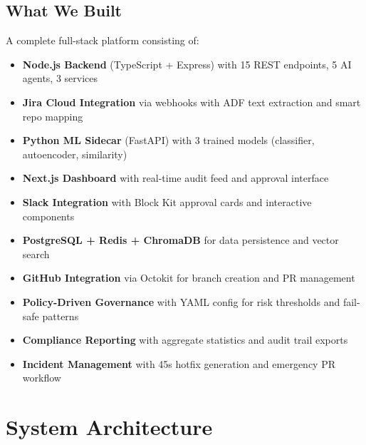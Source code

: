 \documentclass[11pt,a4paper]{article}
\begin{document}
\subsection{What We Built}
A complete full-stack platform consisting of:
\begin{itemize}
    \item \textbf{Node.js Backend} (TypeScript + Express) with 15 REST endpoints, 5 AI agents, 3 services
    \item \textbf{Jira Cloud Integration} via webhooks with ADF text extraction and smart repo mapping
    \item \textbf{Python ML Sidecar} (FastAPI) with 3 trained models (classifier, autoencoder, similarity)
    \item \textbf{Next.js Dashboard} with real-time audit feed and approval interface
    \item \textbf{Slack Integration} with Block Kit approval cards and interactive components
    \item \textbf{PostgreSQL + Redis + ChromaDB} for data persistence and vector search
    \item \textbf{GitHub Integration} via Octokit for branch creation and PR management
    \item \textbf{Policy-Driven Governance} with YAML config for risk thresholds and fail-safe patterns
    \item \textbf{Compliance Reporting} with aggregate statistics and audit trail exports
    \item \textbf{Incident Management} with 45s hotfix generation and emergency PR workflow
\end{itemize}

\newpage
\section{System Architecture}
\end{document}
